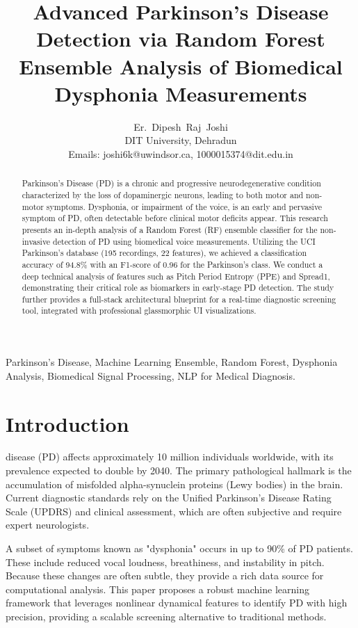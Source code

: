 \documentclass[10pt,journal,compsoc]{IEEEtran}
\title{Advanced Parkinson's Disease Detection via Random Forest Ensemble Analysis of Biomedical Dysphonia Measurements}
\author{Er.~Dipesh~Raj~Joshi\\
DIT University, Dehradun\\
Emails: joshi6k@uwindsor.ca, 1000015374@dit.edu.in}
\begin{document}
\maketitle

\begin{abstract}
Parkinson’s Disease (PD) is a chronic and progressive neurodegenerative condition characterized by the loss of dopaminergic neurons, leading to both motor and non-motor symptoms. Dysphonia, or impairment of the voice, is an early and pervasive symptom of PD, often detectable before clinical motor deficits appear. This research presents an in-depth analysis of a Random Forest (RF) ensemble classifier for the non-invasive detection of PD using biomedical voice measurements. Utilizing the UCI Parkinson’s database (195 recordings, 22 features), we achieved a classification accuracy of 94.8\% with an F1-score of 0.96 for the Parkinson's class. We conduct a deep technical analysis of features such as Pitch Period Entropy (PPE) and Spread1, demonstrating their critical role as biomarkers in early-stage PD detection. The study further provides a full-stack architectural blueprint for a real-time diagnostic screening tool, integrated with professional glassmorphic UI visualizations.
\end{abstract}

\begin{IEEEkeywords}
Parkinson's Disease, Machine Learning Ensemble, Random Forest, Dysphonia Analysis, Biomedical Signal Processing, NLP for Medical Diagnosis.
\end{IEEEkeywords}

\section{Introduction}
 disease (PD) affects approximately 10 million individuals worldwide, with its prevalence expected to double by 2040. The primary pathological hallmark is the accumulation of misfolded alpha-synuclein proteins (Lewy bodies) in the brain. Current diagnostic standards rely on the Unified Parkinson's Disease Rating Scale (UPDRS) and clinical assessment, which are often subjective and require expert neurologists.

A subset of symptoms known as "dysphonia" occurs in up to 90\% of PD patients. These include reduced vocal loudness, breathiness, and instability in pitch. Because these changes are often subtle, they provide a rich data source for computational analysis. This paper proposes a robust machine learning framework that leverages nonlinear dynamical features to identify PD with high precision, providing a scalable screening alternative to traditional methods.
\end{document}
